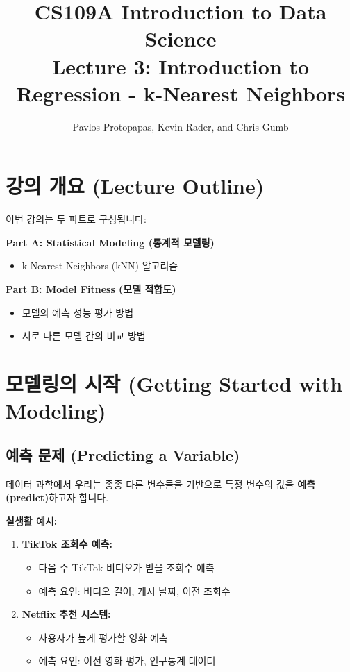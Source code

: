 \documentclass[12pt,a4paper]{article}
\title{\textbf{CS109A Introduction to Data Science\\Lecture 3: Introduction to Regression - k-Nearest Neighbors}}
\author{Pavlos Protopapas, Kevin Rader, and Chris Gumb}
\date{}
\begin{document}
\maketitle
\tableofcontents
\newpage

\section{강의 개요 (Lecture Outline)}

이번 강의는 두 파트로 구성됩니다:

\textbf{Part A: Statistical Modeling (통계적 모델링)}
\begin{itemize}
    \item k-Nearest Neighbors (kNN) 알고리즘
\end{itemize}

\textbf{Part B: Model Fitness (모델 적합도)}
\begin{itemize}
    \item 모델의 예측 성능 평가 방법
    \item 서로 다른 모델 간의 비교 방법
\end{itemize}

\section{모델링의 시작 (Getting Started with Modeling)}

\subsection{예측 문제 (Predicting a Variable)}

데이터 과학에서 우리는 종종 다른 변수들을 기반으로 특정 변수의 값을 \textbf{예측(predict)}하고자 합니다.

\textbf{실생활 예시:}

\begin{enumerate}
    \item \textbf{TikTok 조회수 예측:}
    \begin{itemize}
        \item 다음 주 TikTok 비디오가 받을 조회수 예측
        \item 예측 요인: 비디오 길이, 게시 날짜, 이전 조회수
    \end{itemize}

    \item \textbf{Netflix 추천 시스템:}
    \begin{itemize}
        \item 사용자가 높게 평가할 영화 예측
        \item 예측 요인: 이전 영화 평가, 인구통계 데이터
    \end{itemize}
\end{enumerate}
\end{document}
